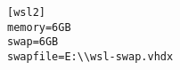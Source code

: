 \begin{lstlisting}
[wsl2]
memory=6GB
swap=6GB
swapfile=E:\\wsl-swap.vhdx
\end{lstlisting}













